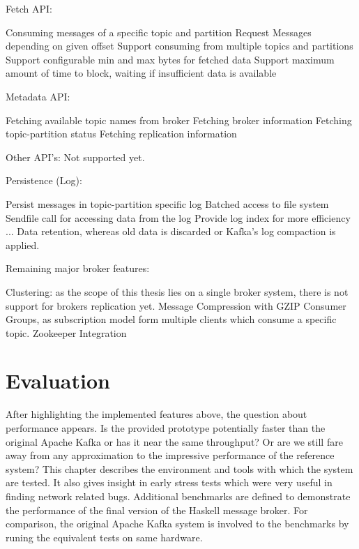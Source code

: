 Fetch API: 
\begin{itemize}
        \tick Consuming messages of a specific topic and partition
        \tick Request Messages depending on given offset
        \fail Support consuming from multiple topics and partitions 
        \fail Support configurable min and max bytes for fetched data
        \fail Support maximum amount of time to block, waiting if insufficient
        data is available
\end{itemize}

Metadata API: 
\begin{itemize}
        \tick Fetching available topic names from broker 
        \fail Fetching broker information
        \fail Fetching topic-partition status
        \fail Fetching replication information
\end{itemize}

Other API's:
Not supported yet.

Persistence (Log): 
\begin{itemize}
        \tick Persist messages in topic-partition specific log
        \tick Batched access to file system
        \tick Sendfile call for accessing data from the log
        \tick Provide log index for more efficiency
        \fail ...
        \fail Data retention, whereas old data is discarded or Kafka's log compaction is applied. 
\end{itemize}

Remaining major broker features: 
\begin{itemize}
        \fail Clustering: as the scope of this thesis lies on a single broker
        system, there is not support for brokers replication yet.
        \fail Message Compression with GZIP
        \fail Consumer Groups, as subscription model form multiple clients which consume a specific topic.
        \fail Zookeeper Integration 
\end{itemize}

\newpage
\section{Evaluation}
After highlighting the implemented features above, the question about
performance appears. Is the provided prototype potentially faster than the original
Apache Kafka or has it near the same throughput? Or are we still fare away from any
approximation to the impressive performance of the reference system? This
chapter describes the environment and tools with which the system are tested.
It also gives insight in early stress tests which were very useful in finding
network related bugs. Additional benchmarks are defined to demonstrate the
performance of the final version of the Haskell message broker. For comparison, 
the original Apache Kafka system is involved to the benchmarks by runing the
equivalent tests on same hardware.


